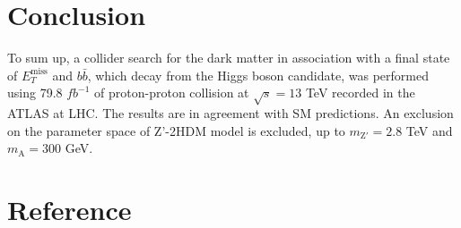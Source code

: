 \documentclass[class=NCU_thesis, crop=false]{standalone}
\begin{document}
\chapter{Conclusion}\label{result}
	To sum up, a collider search for the dark matter in association with a final state of $E_T^{\mathrm{miss}}$ and $b\bar{b}$, which decay from the Higgs boson candidate, was performed using 79.8 $fb^{-1}$ of proton-proton collision at $\sqrt{s} = 13$ TeV recorded in the ATLAS at LHC. The results are in agreement with SM predictions. An exclusion on the parameter space of Z'-2HDM model is excluded, up to $m_{\mathrm{Z'}} = 2.8$ TeV and $m_{\mathrm{A}} = 300$ GeV.


\chapter{Reference}
\end{document}
